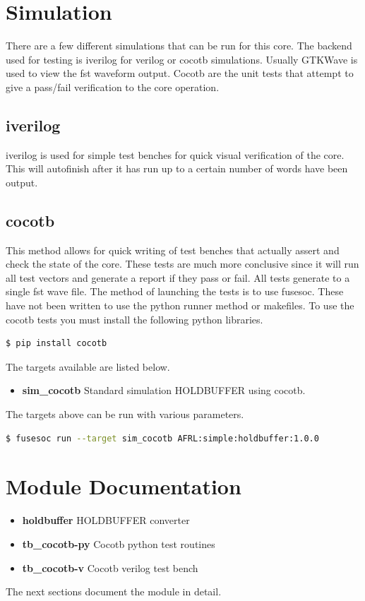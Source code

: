 \newpage

\section{Simulation}
\par
There are a few different simulations that can be run for this core. The backend used for testing is iverilog for verilog or cocotb simulations. Usually GTKWave is used to view the fst waveform output. Cocotb are the unit tests that attempt to give a pass/fail verification to the core operation.

\subsection{iverilog}
\par
iverilog is used for simple test benches for quick visual verification of the core. This will autofinish after it has
run up to a certain number of words have been output.

\subsection{cocotb}
\par
This method allows for quick writing of test benches that actually assert and check the state of the core.
These tests are much more conclusive since it will run all test vectors and generate a report if they
pass or fail. All tests generate to a single fst wave file. The method of launching the tests is to use
fusesoc. These have not been written to use the python runner method or makefiles.
To use the cocotb tests you must install the following python libraries.
\begin{lstlisting}[language=bash]
  $ pip install cocotb
\end{lstlisting}

The targets available are listed below.
\begin{itemize}
  \item \textbf{sim\_cocotb} Standard simulation HOLDBUFFER using cocotb.
\end{itemize}

The targets above can be run with various parameters.
\begin{lstlisting}[language=bash]
  $ fusesoc run --target sim_cocotb AFRL:simple:holdbuffer:1.0.0
\end{lstlisting}

\newpage

\section{Module Documentation} \label{Module Documentation}

\par

\begin{itemize}
\item \textbf{holdbuffer} HOLDBUFFER converter\\
\item \textbf{tb\_cocotb-py} Cocotb python test routines\\
\item \textbf{tb\_cocotb-v} Cocotb verilog test bench\\
\end{itemize}
The next sections document the module in detail.

